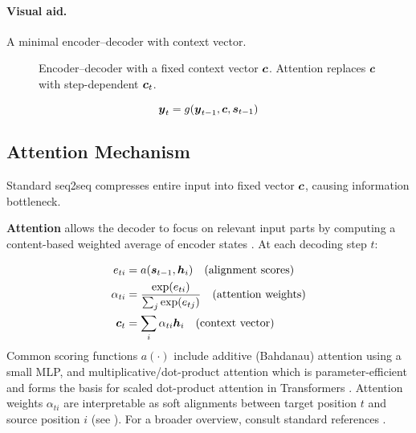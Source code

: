 \paragraph{Visual aid.} A minimal encoder–decoder with context vector.
\begin{figure}[h]
    \centering
    \caption{Encoder–decoder with a fixed context vector $\boldsymbol{c}$. Attention replaces $\boldsymbol{c}$ with step-dependent $\boldsymbol{c}_t$.}
\end{figure}

\begin{equation}
\boldsymbol{y}_t = g(\boldsymbol{y}_{t-1}, \boldsymbol{c}, \boldsymbol{s}_{t-1})
\end{equation}

\subsection{Attention Mechanism}

Standard seq2seq compresses entire input into fixed vector $\boldsymbol{c}$, causing information bottleneck.

\textbf{Attention} allows the decoder to focus on relevant input parts by computing a content-based weighted average of encoder states \cite{Bahdanau2014}. At each decoding step $t$:

\begin{align}
e_{ti} &= a(\boldsymbol{s}_{t-1}, \boldsymbol{h}_i) \quad \text{(alignment scores)} \\
\alpha_{ti} &= \frac{\exp(e_{ti})}{\sum_j \exp(e_{tj})} \quad \text{(attention weights)} \\
\boldsymbol{c}_t &= \sum_i \alpha_{ti} \boldsymbol{h}_i \quad \text{(context vector)}
\end{align}
Common scoring functions $a(\cdot)$ include additive (Bahdanau) attention using a small MLP, and multiplicative/dot-product attention which is parameter-efficient and forms the basis for scaled dot-product attention in Transformers \cite{Vaswani2017}. Attention weights $\alpha_{ti}$ are interpretable as soft alignments between target position $t$ and source position $i$ (see \cite{WebAttentionWikipedia}). For a broader overview, consult standard references \cite{WebDLBRNN,D2LChapterAttention}.

